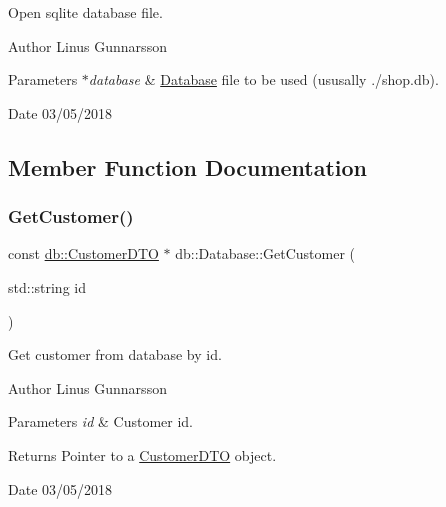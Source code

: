 Open sqlite database file. \begin{DoxyAuthor}{Author}
Linus Gunnarsson 
\end{DoxyAuthor}

\begin{DoxyParams}{Parameters}
{\em $\ast$database} & \mbox{\hyperlink{classdb_1_1Database}{Database}} file to be used (ususally \textquotesingle{}./shop.db\textquotesingle{}). \\
\hline
\end{DoxyParams}
\begin{DoxyDate}{Date}
03/05/2018 
\end{DoxyDate}


\subsection{Member Function Documentation}
\mbox{\label{classdb_1_1Database_a50871011cdeb0a80894f08549240c3fa}} 
\subsubsection{\texorpdfstring{Get\+Customer()}{GetCustomer()}}
{\footnotesize\ttfamily const \mbox{\hyperlink{classdb_1_1CustomerDTO}{db\+::\+Customer\+D\+TO}} $\ast$ db\+::\+Database\+::\+Get\+Customer (\begin{DoxyParamCaption}\item[{std\+::string}]{id }\end{DoxyParamCaption})}

Get customer from database by id. \begin{DoxyAuthor}{Author}
Linus Gunnarsson 
\end{DoxyAuthor}

\begin{DoxyParams}{Parameters}
{\em id} & Customer id. \\
\hline
\end{DoxyParams}
\begin{DoxyReturn}{Returns}
Pointer to a \mbox{\hyperlink{classdb_1_1CustomerDTO}{Customer\+D\+TO}} object. 
\end{DoxyReturn}
\begin{DoxyDate}{Date}
03/05/2018 
\end{DoxyDate}
\mbox{\label{classdb_1_1Database_a1fb85ca95813c5b08fa337ee876dcc77}} 
